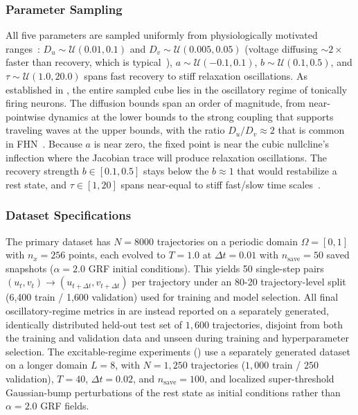 \documentclass[runningheads]{llncs}
\begin{document}
\subsubsection{Parameter Sampling}
\label{sec:parameter_sampling}

All five parameters are sampled uniformly from physiologically motivated ranges~\cite{FitzHugh1961,Keener2009,Izhikevich2007}: $D_u \sim \mathcal{U}(0.01, 0.1)$ and $D_v \sim \mathcal{U}(0.005, 0.05)$ (voltage diffusing $\sim2\times$ faster than recovery, which is typical~\cite{Rinzel1998,Ermentrout2010}), $a \sim \mathcal{U}(-0.1, 0.1)$, $b \sim \mathcal{U}(0.1, 0.5)$, and $\tau \sim \mathcal{U}(1.0, 20.0)$ spans fast recovery to stiff relaxation oscillations. As established in , the entire sampled cube lies in the oscillatory regime of tonically firing neurons. The diffusion bounds span an order of magnitude, from near-pointwise dynamics at the lower bounds to the strong coupling that supports traveling waves at the upper bounds, with the ratio $D_u/D_v \approx 2$ that is common in FHN~\cite{Rinzel1998,Ermentrout2010}. Because $a$ is near zero, the fixed point is near the cubic nullcline's inflection where the Jacobian trace will produce relaxation oscillations. The recovery strength $b \in [0.1, 0.5]$ stays below the $b \approx 1$ that would restabilize a rest state, and $\tau \in [1, 20]$ spans near-equal to stiff fast/slow time scales~\cite{Izhikevich2007,Terman1992}.


\subsubsection{Dataset Specifications}
\label{sec:dataset_specs}

The primary dataset has $N = 8000$ trajectories on a periodic domain $\Omega = [0, 1]$ with $n_x = 256$ points, each evolved to $T = 1.0$ at $\Delta t = 0.01$ with $n_{\text{save}} = 50$ saved snapshots ($\alpha = 2.0$ GRF initial conditions). This yields 50 single-step pairs $(u_t, v_t) \rightarrow (u_{t+\Delta t}, v_{t+\Delta t})$ per trajectory under an 80-20 trajectory-level split (6{,}400 train / 1{,}600 validation) used for training and model selection. All final oscillatory-regime metrics in  are instead reported on a separately generated, identically distributed held-out test set of $1{,}600$ trajectories, disjoint from both the training and validation data and unseen during training and hyperparameter selection. The excitable-regime experiments () use a separately generated dataset on a longer domain $L = 8$, with $N = 1{,}250$ trajectories ($1{,}000$ train / $250$ validation), $T = 40$, $\Delta t = 0.02$, and $n_{\text{save}} = 100$, and localized super-threshold Gaussian-bump perturbations of the rest state as initial conditions rather than $\alpha = 2.0$ GRF fields.
\end{document}
